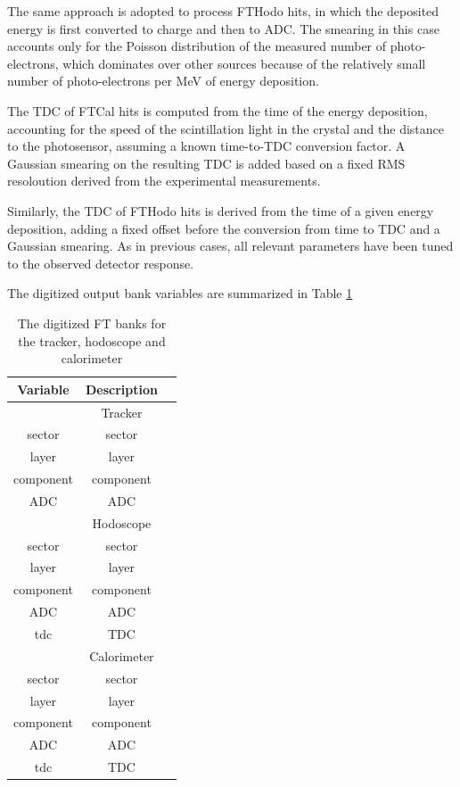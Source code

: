 The same approach is adopted to process FTHodo hits, in which the deposited energy is first converted to charge and then to ADC.
The smearing in this case accounts only for the Poisson distribution of the measured number of photo-electrons,
which dominates over other sources because of the relatively small number of photo-electrons per MeV of energy deposition.

The TDC of FTCal hits is computed from the time of the energy deposition, accounting for the speed of the scintillation light in
the crystal and the distance to the photosensor, assuming a known time-to-TDC conversion factor. A Gaussian smearing on the
resulting TDC is added based on a fixed RMS resoloution derived from the experimental measurements.

Similarly, the TDC of FTHodo hits is derived from the time of a given energy deposition, adding a fixed offset before the
conversion from time to TDC and a Gaussian smearing. As in previous cases, all relevant parameters have been tuned to the
observed detector response.

The digitized output bank variables are summarized in Table \ref{tab:ftBank}

\begin{table}[h]
	\begin{center}
		\begin{tabular}{| c | c | c |}
			\hline \hline
			Variable            & Description      \\
			\hline
		                         & Tracker         \\
			\hline
                         sector  &     sector      \\
                          layer  &      layer      \\
                      component  &  component      \\
                            ADC  &        ADC      \\
			\hline
		                         & Hodoscope       \\
			\hline
						 sector  &     sector      \\
                          layer  &      layer      \\
                      component  &  component      \\
                            ADC  &        ADC      \\
                            tdc  &        TDC      \\
			\hline
								 & Calorimeter     \\
			\hline
				         sector  &     sector      \\
				   	      layer  &      layer      \\
					  component  &  component      \\
							ADC  &        ADC      \\
							tdc  &        TDC      \\
			\hline \hline
		\end{tabular}
	\end{center}
	\caption{The digitized FT banks for the tracker, hodoscope and calorimeter}\label{tab:ftBank}
\end{table}

